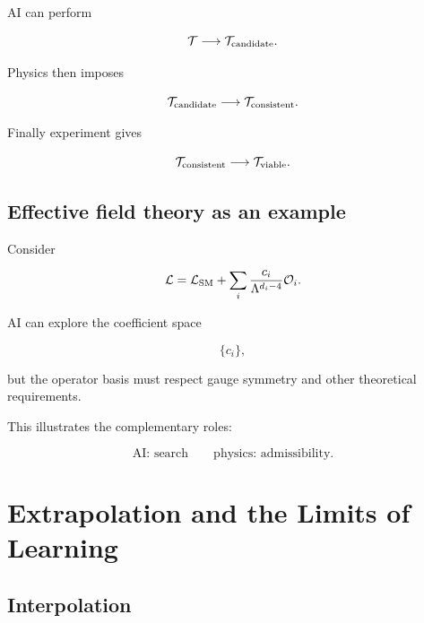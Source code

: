\documentclass[11pt,a4paper,oneside]{book}
\begin{document}
AI can perform

\begin{equation}
\mathcal{T}
\longrightarrow
\mathcal{T}_{\rm candidate}.
\end{equation}

Physics then imposes

\begin{equation}
\mathcal{T}_{\rm candidate}
\longrightarrow
\mathcal{T}_{\rm consistent}.
\end{equation}

Finally experiment gives

\begin{equation}
\mathcal{T}_{\rm consistent}
\longrightarrow
\mathcal{T}_{\rm viable}.
\end{equation}

\section{Effective field theory as an example}

Consider

\begin{equation}
\mathcal{L}
=
\mathcal{L}_{\rm SM}
+
\sum_i
\frac{c_i}{\Lambda^{d_i-4}}
\mathcal{O}_i.
\end{equation}

AI can explore the coefficient space

\begin{equation}
\{c_i\},
\end{equation}

but the operator basis must respect gauge symmetry and other theoretical
requirements.

This illustrates the complementary roles:

\begin{equation}
\text{AI: search}
\qquad
\text{physics: admissibility}.
\end{equation}

\chapter{Extrapolation and the Limits of Learning}

\section{Interpolation}
\end{document}
